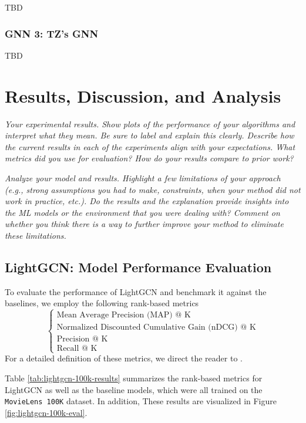 \documentclass{article}
\begin{document}
TBD

\subsubsection{GNN 3: TZ's GNN}

TBD

\section{Results, Discussion, and Analysis}

\textit{Your experimental results. Show plots of the performance of your algorithms and interpret what they mean. Be sure to label and explain this clearly. Describe how the current results in each of the experiments align with your expectations. What metrics did you use for evaluation? How do your results compare to prior work?}

\textit{Analyze your model and results. Highlight a few limitations of your approach (e.g., strong assumptions you had to make, constraints, when your method did not work in practice, etc.). Do
the results and the explanation provide insights into the ML models or the environment that you were dealing with? Comment on whether you think there is a way to further improve your method to eliminate these limitations.}

\subsection{LightGCN: Model Performance Evaluation} \label{lightgcn-eval}

To evaluate the performance of LightGCN and benchmark it against the baselines, we employ the following rank-based metrics
$$
\begin{cases}
\text{Mean Average Precision (MAP) @ K} \\
\text{Normalized Discounted Cumulative Gain (nDCG) @ K} \\
\text{Precision @ K} \\
\text{Recall @ K}
\end{cases}
$$
For a detailed definition of these metrics, we direct the reader to \cite{metrics}.

Table \ref{tab:lightgcn-100k-results} summarizes the rank-based metrics for LightGCN as well as the baseline models, which were all trained on the \texttt{MovieLens 100K} dataset. In addition, These results are visualized in Figure \ref{fig:lightgcn-100k-eval}.
\end{document}
